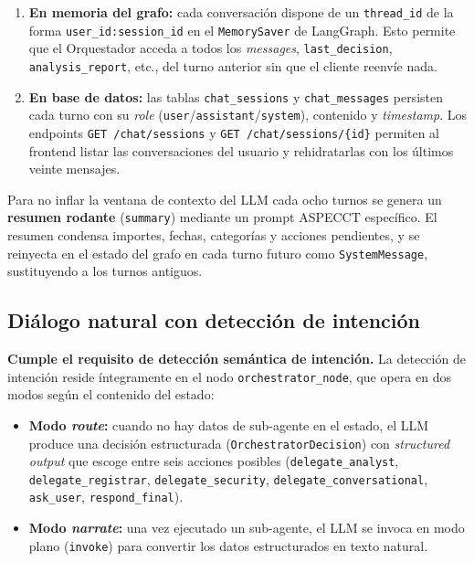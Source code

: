 \begin{enumerate}[leftmargin=1.5em,itemsep=0.2em]
  \item \textbf{En memoria del grafo:} cada conversación dispone de
        un \texttt{thread\_id} de la forma \texttt{user\_id:session\_id}
        en el \texttt{MemorySaver} de LangGraph. Esto permite que el
        Orquestador acceda a todos los \textit{messages},
        \texttt{last\_decision}, \texttt{analysis\_report}, etc., del
        turno anterior sin que el cliente reenvíe nada.
  \item \textbf{En base de datos:} las tablas \texttt{chat\_sessions}
        y \texttt{chat\_messages} persisten cada turno con su
        \textit{role} (\texttt{user}/\texttt{assistant}/\texttt{system}),
        contenido y \textit{timestamp}. Los endpoints
        \texttt{GET /chat/sessions} y
        \texttt{GET /chat/sessions/\{id\}} permiten al frontend
        listar las conversaciones del usuario y rehidratarlas con
        los últimos veinte mensajes.
\end{enumerate}

Para no inflar la ventana de contexto del LLM cada ocho turnos se
genera un \textbf{resumen rodante} (\texttt{summary}) mediante un
prompt ASPECCT específico. El resumen condensa importes, fechas,
categorías y acciones pendientes, y se reinyecta en el estado del
grafo en cada turno futuro como \texttt{SystemMessage}, sustituyendo
a los turnos antiguos.

\subsection{Diálogo natural con detección de intención}
\label{subsec:intencion}

\textbf{Cumple el requisito de detección semántica de intención.}
La detección de intención reside íntegramente en el nodo
\texttt{orchestrator\_node}, que opera en dos modos según el contenido
del estado:

\begin{itemize}[leftmargin=1.5em,itemsep=0.2em]
  \item \textbf{Modo \textit{route}:} cuando no hay datos de
        sub-agente en el estado, el LLM produce una decisión
        estructurada (\texttt{OrchestratorDecision}) con
        \textit{structured output} que escoge entre seis acciones
        posibles (\texttt{delegate\_analyst}, \texttt{delegate\_registrar},
        \texttt{delegate\_security}, \texttt{delegate\_conversational},
        \texttt{ask\_user}, \texttt{respond\_final}).
  \item \textbf{Modo \textit{narrate}:} una vez ejecutado un
        sub-agente, el LLM se invoca en modo plano (\texttt{invoke})
        para convertir los datos estructurados en texto natural.
\end{itemize}

